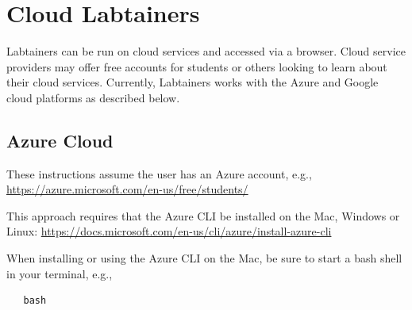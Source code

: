\documentclass[12pt]{article}
\begin{document}
\section{Cloud Labtainers}
\label{cloud-labtainers}
Labtainers can be run on cloud services and accessed via a browser.
Cloud service providers may offer free accounts for students or others looking to learn about their cloud services.
Currently, Labtainers works with the Azure and Google cloud platforms as described below.

\subsection{Azure Cloud}
These instructions assume the user 
has an Azure account, e.g., \url{https://azure.microsoft.com/en-us/free/students/}

This approach requires that the Azure CLI be installed on  the Mac, Windows or Linux:
\url{https://docs.microsoft.com/en-us/cli/azure/install-azure-cli}

When installing or using the Azure CLI on the Mac, be sure to start a bash shell in your terminal, e.g.,
\begin{verbatim}
   bash
\end{verbatim}
\end{document}
